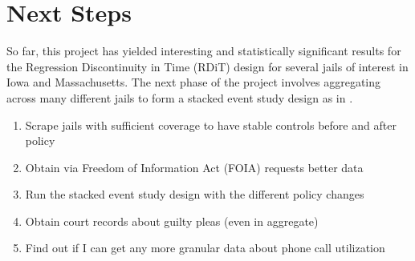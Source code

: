 \documentclass[12pt, a4paper]{article}
\begin{document}
\section{Next Steps}

So far, this project has yielded interesting and statistically significant results for the Regression Discontinuity in Time (RDiT) design for several jails of interest in Iowa and Massachusetts. The next phase of the project involves aggregating across many different jails to form a stacked event study design as in \citep{LafortuneRothsteinSchanzenbach2018}.
\begin{enumerate}
    \item Scrape jails with sufficient coverage to have stable controls before and after policy
    \item Obtain via Freedom of Information Act (FOIA) requests better data
    \item Run the stacked event study design with the different policy changes
    \item Obtain court records about guilty pleas (even in aggregate)
    \item Find out if I can get any more granular data about phone call utilization
\end{enumerate}







\newpage

\end{document}
